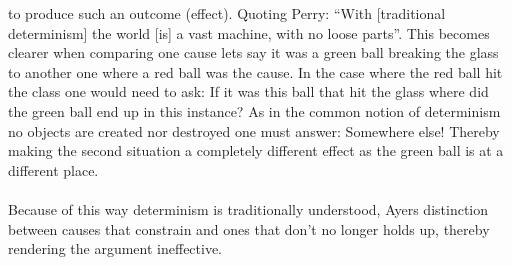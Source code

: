 \documentclass[14pt]{article}
\begin{document}
to produce such an outcome (effect). Quoting Perry: “With [traditional determinism] the world [is] a vast machine,
with no loose parts”\autocite[229]{Perry}.
This becomes clearer when comparing one cause lets say it was a green ball breaking the glass to another one
where a red ball was the cause. In the case where the red ball hit the class one would need to ask:
If it was this ball that hit the glass where did the green ball end up in this instance?
As in the common notion of determinism no objects are created nor destroyed one must answer:
Somewhere else! Thereby making the second
situation a completely different effect as the green ball is at a different place.\\
\\
Because of this way determinism is traditionally understood, Ayers distinction between causes that constrain and
ones that don't no longer holds up, thereby rendering the argument ineffective.

\printbibliography
\end{document}

